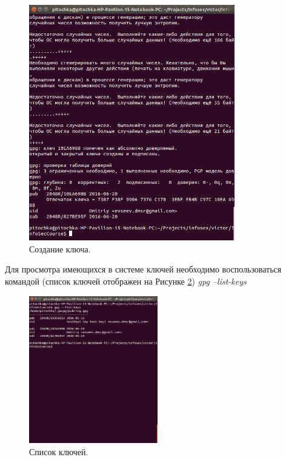\documentclass[10pt,a4paper]{report}
\begin{document}
	\begin{figure}[h]
		\begin{center}
			\includegraphics[width=0.8\textwidth]{Img/15} 
			\caption{Создание ключа.}
			\label{Img:15}
		\end{center}
	\end{figure}
	\pagebreak
	
	Для просмотра имеющихся в системе ключей необходимо воспользоваться командой (список ключей отображен на Рисунке \ref{Img:16}) \textit{gpg --list-keys}	
	
	\begin{figure}[h!]
		\begin{center}
			\includegraphics[width=0.5\textwidth]{Img/16}
			\caption{Список ключей.}
			\label{Img:16}
		\end{center}
	\end{figure}
	\pagebreak
	
\end{document}
